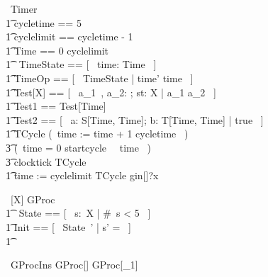 \documentclass{article} %
\begin{document}
\begin{circus}
   \circprocess\ Timer ~\circdef~ \circbegin \\
     \t1 cycletime == 5 \\ %
     \t1 cyclelimit == cycletime - 1 \\ %
     \t1 Time == 0 \upto cyclelimit \\
     \t1 \circstate\ TimeState == [~ time: Time ~] \\ %
     \t1 TimeOp == [~ \Delta TimeState | time' \geq time ~] \\
     \t1 Test[X] == [~ a\_1~, a\_2: \nat; st: X | a\_1 \leq a\_2 ~] \\
     \t1 Test1 == Test[Time] \\
     \t1 Test2 == [~ a: S[Time, Time]; b: T[Time, Time] | true ~] \\
     \t1 TCycle \circdef (~time := time + 1 \mod cycletime ~) \circseq \\ %
            \t3 (\circif\ time = 0 \circthen startcycle \then \Skip\ \circelse\ time  \circthen \Skip\ \circfi) \circseq \\ %
            \t3 clocktick \then TCycle \\
     \t1 \circspot time := cyclelimit \circseq TCycle \circseq gin[\nat]?x \then \Skip \\
   \circend
\end{circus}

\begin{circus}
    \circprocess\ [X] GProc \circdef \circbegin \\ 
    \t1 \circstate\ State == [~ s:\power~X | \#~s < 5 ~] \\
    \t1 Init == [~ State~' | s' = \emptyset ~] \\
    \t1 \circspot \Skip \\
    \circend
\end{circus}

\begin{circus}
    \circprocess\ GProcIns \circdef GProc[\nat] \circseq GProc[\nat_1] \\
\end{circus}
\end{document}
